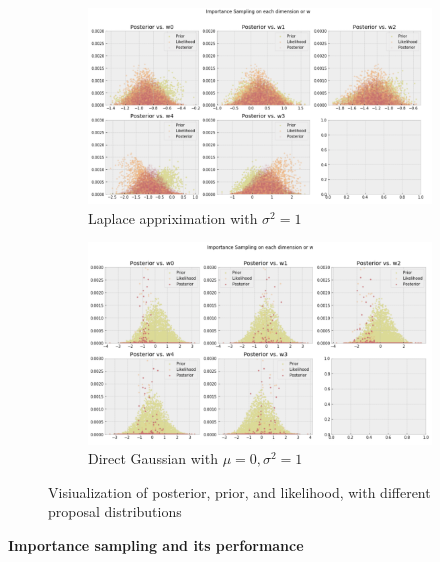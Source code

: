 \documentclass{article} %
\begin{document}
    \begin{figure}[!hbt]
      \centering
      \begin{subfigure}[b]{0.85\linewidth}
        \includegraphics[width=\linewidth]{A5_2_1.png}
        \caption{Laplace appriximation with $\sigma^2=1$}
      \end{subfigure}
      \begin{subfigure}[b]{0.85\linewidth}
        \includegraphics[width=\linewidth]{A5_2_2.png}
        \caption{Direct Gaussian with $\mu=0, \sigma^2=1$}
      \end{subfigure}
      \caption{Visiualization of posterior, prior, and likelihood, with different proposal distributions}
      \label{fig:Q1_1}
    \end{figure}

\vspace{1cm}
{\large\textbf{Importance sampling and its performance}}
\end{document}
